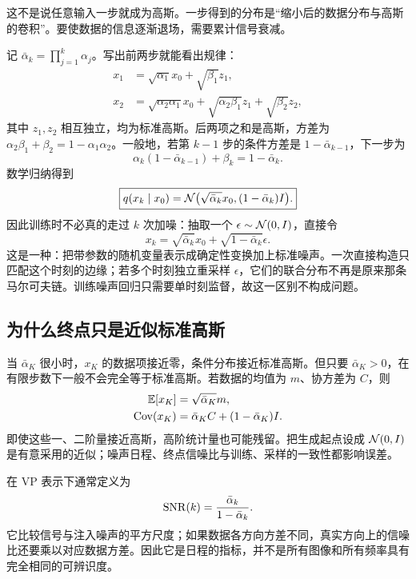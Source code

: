 这不是说任意输入一步就成为高斯。一步得到的分布是“缩小后的数据分布与高斯的卷积”。要使数据的信息逐渐退场，需要累计信号衰减。

记 $\bar\alpha_k=\prod_{j=1}^k\alpha_j$。写出前两步就能看出规律：
\begin{align}
 x_1&=\sqrt{\alpha_1}x_0+\sqrt{\beta_1}z_1,\\
 x_2&=\sqrt{\alpha_2\alpha_1}x_0
 +\sqrt{\alpha_2\beta_1}z_1+\sqrt{\beta_2}z_2,
\end{align}
其中 $z_1,z_2$ 相互独立，均为标准高斯。后两项之和是高斯，方差为
$\alpha_2\beta_1+\beta_2=1-\alpha_1\alpha_2$。一般地，若第 $k-1$ 步的条件方差是 $1-\bar\alpha_{k-1}$，下一步为
\begin{equation}
 \alpha_k(1-\bar\alpha_{k-1})+\beta_k=1-\bar\alpha_k.
\end{equation}
数学归纳得到
\begin{equation}\boxed{
 q(x_k\mid x_0)=\mathcal{N}\bigl(\sqrt{\bar\alpha_k}x_0,(1-\bar\alpha_k)I\bigr).
 }\label{eq:forward-marginal}\end{equation}
因此训练时不必真的走过 $k$ 次加噪：抽取一个 $\epsilon\sim\mathcal{N}(0,I)$，直接令
\begin{equation}
 x_k=\sqrt{\bar\alpha_k}x_0+\sqrt{1-\bar\alpha_k}\epsilon.
\end{equation}
这是一种：把带参数的随机变量表示成确定性变换加上标准噪声。一次直接构造只匹配这个时刻的边缘；若多个时刻独立重采样 $\epsilon$，它们的联合分布不再是原来那条马尔可夫链。训练噪声回归只需要单时刻监督，故这一区别不构成问题。

\subsection{为什么终点只是近似标准高斯}
当 $\bar\alpha_K$ 很小时，$x_K$ 的数据项接近零，条件分布接近标准高斯。但只要 $\bar\alpha_K>0$，在有限步数下一般不会完全等于标准高斯。若数据的均值为 $m$、协方差为 $C$，则
\begin{align}
 \mathbb{E}[x_K]&=\sqrt{\bar\alpha_K}m,\\
 \operatorname{Cov}(x_K)&=\bar\alpha_KC+(1-\bar\alpha_K)I.
\end{align}
即使这些一、二阶量接近高斯，高阶统计量也可能残留。把生成起点设成 $\mathcal{N}(0,I)$ 是有意采用的近似；噪声日程、终点信噪比与训练、采样的一致性都影响误差。

在 VP 表示下通常定义为
\begin{equation}
 \operatorname{SNR}(k)=\frac{\bar\alpha_k}{1-\bar\alpha_k}.
\end{equation}
它比较信号与注入噪声的平方尺度；如果数据各方向方差不同，真实方向上的信噪比还要乘以对应数据方差。因此它是日程的指标，并不是所有图像和所有频率具有完全相同的可辨识度。

